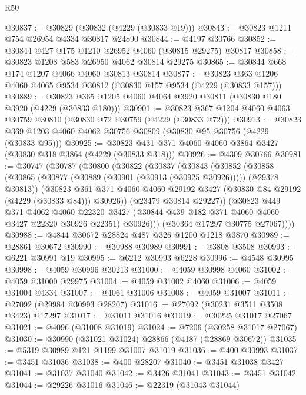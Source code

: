 \begin{lexlean}{R50}
\begin{coremodule}
@30837 := @30829 (@30832 (@4229 (@30833 @19)))
@30843 := @30823 @1211 @754 @26954 @4334 @30817 @24890
@30844 := @4197 @30766
@30852 := @30844 @427 @175 @1210 @26952 @4060 (@30815 @29275) @30817
@30858 := @30823 @1208 @583 @26950 @4062 @30814 @29275
@30865 := @30844 @668 @174 @1207 @4066 @4060 @30813 @30814
@30877 := @30823 @363 @1206 @4060 @4065 @9534 @30812 (@30830 @157 @9534 (@4229 (@30833 @157)))
@30889 := @30823 @365 @1205 @4060 @4064 @3920 @30811 (@30830 @180 @3920 (@4229 (@30833 @180)))
@30901 := @30823 @367 @1204 @4060 @4063 @30759 @30810 (@30830 @72 @30759 (@4229 (@30833 @72)))
@30913 := @30823 @369 @1203 @4060 @4062 @30756 @30809 (@30830 @95 @30756 (@4229 (@30833 @95)))
@30925 := @30823 @431 @371 @4060 @4060 @3864 @3427 (@30830 @318 @3864 (@4229 (@30833 @318)))
@30926 := @4309 @30766
@30981 := @30747
    (@30787
      (@30800
        (@30822
          (@30837
            (@30843
              (@30852
                (@30858
                  (@30865 (@30877 (@30889 (@30901 (@30913 (@30925 @30926))))) (@29378 @30813))
                  (@30823
                    @361
                    @371
                    @4060
                    @4060
                    @29192
                    @3427
                    (@30830 @84 @29192 (@4229 (@30833 @84)))
                    @30926))
                (@23479 @30814 @29227))
              (@30823
                @449
                @371
                @4062
                @4060
                @22320
                @3427
                (@30844 @439 @182 @371 @4060 @4060 @3427 @22320 @30926 @22351)
                @30926)))
          (@30364 @17297 @30775 @27067))))
@30988 := @4844 @30672 @28824 @487 @326 @1200 @1218 @3870
@30989 := @28861 @30672
@30990 := @30988 @30989
@30991 := @3808 @3508
@30993 := @6221 @30991 @19
@30995 := @6212 @30993 @6228
@30996 := @4548 @30995
@30998 := @4059 @30996 @30213
@31000 := @4059 @30998 @4060
@31002 := @4059 @31000 @29975
@31004 := @4059 @31002 @4060
@31006 := @4059 @31004 @4334
@31007 := @4061 @31006
@31008 := @4059 @31007
@31011 := @27092 (@29984 @30993 @28207)
@31016 := @27092 (@30231 @3511 @3508 @3423) @17297
@31017 := @31011 @31016
@31019 := @30225 @31017 @27067
@31021 := @4096 (@31008 @31019)
@31024 := @7206 (@30258 @31017 @27067)
@31030 := @30990 (@31021 @31024) @28866 (@4187 (@28869 @30672))
@31035 := @5319 @30989 @121 @1199 @31007 @31019
@31036 := @400 @30993
@31037 := @3451 @31036
@31038 := @400 @28207
@31040 := @3451 @31038 @3427
@31041 := @31037 @31040
@31042 := @3426 @31041
@31043 := @3451 @31042
@31044 := @29226 @31016
@31046 := @22319 (@31043 @31044)

\end{coremodule}
\end{lexlean}
